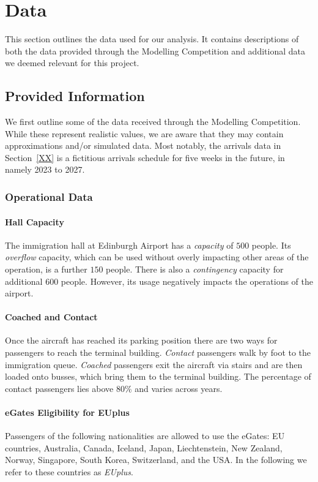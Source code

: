 \documentclass[10pt]{article}
\begin{document}
\section{Data}
This section outlines the data used for our analysis. It contains descriptions of both the data provided through the Modelling Competition and additional data we deemed relevant for this project.

\subsection{Provided Information}

We first outline some of the data received through the Modelling Competition. While these represent realistic values, we are aware that they may contain approximations and/or simulated data. Most notably, the arrivals data in Section~\ref{XX} is a fictitious arrivals schedule for five weeks in the future, in namely 2023 to 2027. 

\subsubsection{Operational Data}

\paragraph{Hall Capacity}
The immigration hall at Edinburgh Airport has a \textit{capacity} of $500$ people. Its \textit{overflow} capacity, which can be used without overly impacting other areas of the operation, is a further $150$ people. There is also a \textit{contingency} capacity for additional $600$ people. However, its usage negatively impacts the operations of the airport.

\paragraph{Coached and Contact}
Once the aircraft has reached its parking position there are two ways for passengers to reach the terminal building. \textit{Contact} passengers walk by foot to the immigration queue. \textit{Coached} passengers exit the aircraft via stairs and are then loaded onto busses, which bring them to the terminal building. The percentage of contact passengers lies above 80\% and varies across years.

\paragraph{eGates Eligibility for EUplus}
Passengers of the following nationalities are allowed to use the eGates: EU countries, Australia, Canada, Iceland, Japan, Liechtenstein, New Zealand, Norway, Singapore, South Korea, Switzerland, and the USA. In the following we refer to these countries as \textit{EUplus}. 
\end{document}
